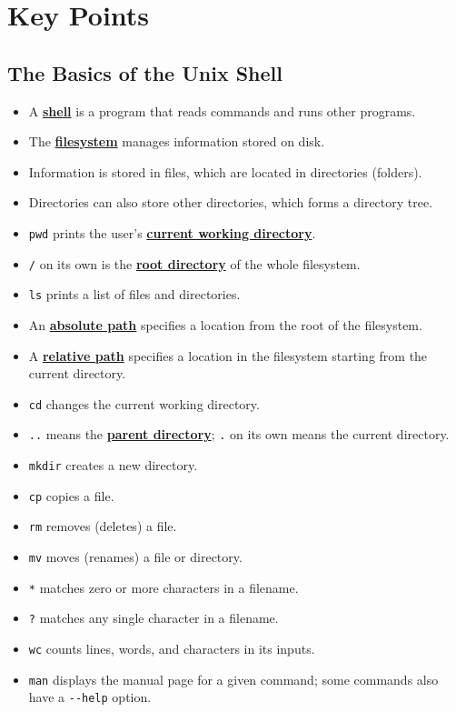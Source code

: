 \documentclass[
]{krantz}
\providecommand{\tightlist}{%
  \setlength{\itemsep}{0pt}\setlength{\parskip}{0pt}}
\newcommand{\gref}[2]{\hyperlink{#2}{\textbf{#1}}}
\begin{document}
\hypertarget{keypoints}{%
\chapter{Key Points}\label{keypoints}}

\hypertarget{the-basics-of-the-unix-shell-1}{%
\section{The Basics of the Unix Shell}\label{the-basics-of-the-unix-shell-1}}

\begin{itemize}
\tightlist
\item
  A \gref{shell}{shell} is a program that reads commands and runs other programs.
\item
  The \gref{filesystem}{filesystem} manages information stored on disk.
\item
  Information is stored in files, which are located in directories (folders).
\item
  Directories can also store other directories, which forms a directory tree.
\item
  \texttt{pwd} prints the user's \gref{current working directory}{current\_working\_directory}.
\item
  \texttt{/} on its own is the \gref{root directory}{root\_directory} of the whole filesystem.
\item
  \texttt{ls} prints a list of files and directories.
\item
  An \gref{absolute path}{absolute\_path} specifies a location from the root of the filesystem.
\item
  A \gref{relative path}{relative\_path} specifies a location in the filesystem starting from the current directory.
\item
  \texttt{cd} changes the current working directory.
\item
  \texttt{..} means the \gref{parent directory}{parent\_directory}; \texttt{.} on its own means the current directory.
\item
  \texttt{mkdir} creates a new directory.
\item
  \texttt{cp} copies a file.
\item
  \texttt{rm} removes (deletes) a file.
\item
  \texttt{mv} moves (renames) a file or directory.
\item
  \texttt{*} matches zero or more characters in a filename.
\item
  \texttt{?} matches any single character in a filename.
\item
  \texttt{wc} counts lines, words, and characters in its inputs.
\item
  \texttt{man} displays the manual page for a given command; some commands also have a \texttt{-\/-help} option.
\end{itemize}
\end{document}
